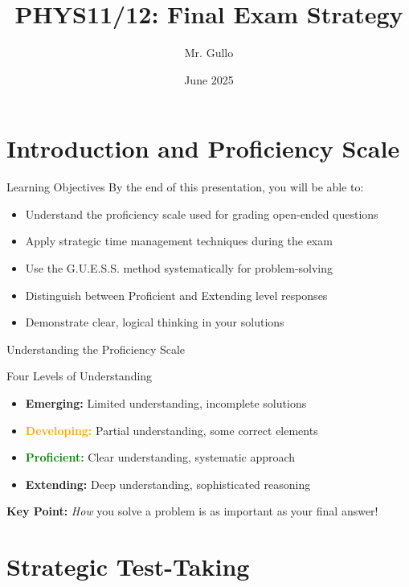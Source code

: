 \documentclass{beamer}
\title[Physics Final Strategy]{PHYS11/12: Final Exam Strategy}
\author[Mr. Gullo]{Mr. Gullo}
\date[June 2025]{June 2025}
\begin{document}
\frame{\titlepage}

\section{Introduction and Proficiency Scale}

\begin{frame}{Learning Objectives}
By the end of this presentation, you will be able to:
\begin{itemize}
\item Understand the proficiency scale used for grading open-ended questions
\item Apply strategic time management techniques during the exam
\item Use the G.U.E.S.S. method systematically for problem-solving
\item Distinguish between Proficient and Extending level responses
\item Demonstrate clear, logical thinking in your solutions
\end{itemize}
\end{frame}

\begin{frame}{Understanding the Proficiency Scale}
\begin{block}{Four Levels of Understanding}
\begin{itemize}
\item \textcolor{ds9red}{\textbf{Emerging:}} Limited understanding, incomplete solutions
\item \textcolor{orange}{\textbf{Developing:}} Partial understanding, some correct elements
\item \textcolor{green}{\textbf{Proficient:}} Clear understanding, systematic approach
\item \textcolor{ds9blue}{\textbf{Extending:}} Deep understanding, sophisticated reasoning
\end{itemize}
\end{block}

\vspace{0.5cm}

\textbf{Key Point:} \emph{How} you solve a problem is as important as your final answer!
\end{frame}

\section{Strategic Test-Taking}
\end{document}
